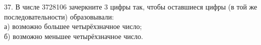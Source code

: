 37. В числе 3728106 зачеркните 3 цифры так, чтобы оставшиеся цифры (в той же последовательности) образовывали:\\
а) возможно большее четырёхзначное число;\\
б) возможно меньшее четырёхзначное число.\\
